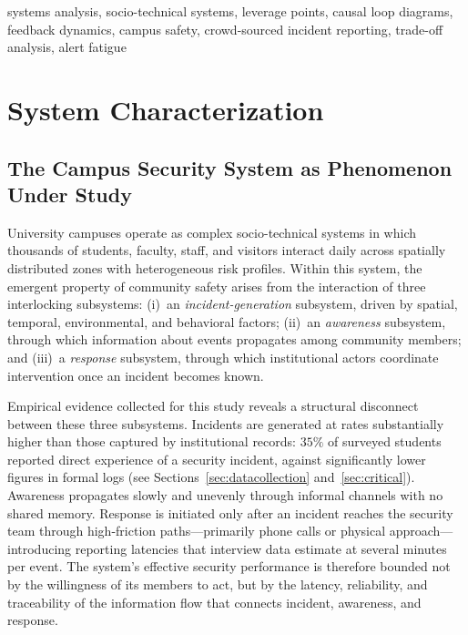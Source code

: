 \documentclass[conference]{IEEEtran}
\begin{document}
\begin{IEEEkeywords}
systems analysis, socio-technical systems, leverage points, causal loop
diagrams, feedback dynamics, campus safety, crowd-sourced incident
reporting, trade-off analysis, alert fatigue
\end{IEEEkeywords}

\section{System Characterization}

\subsection{The Campus Security System as Phenomenon Under Study}
University campuses operate as complex socio-technical systems in which
thousands of students, faculty, staff, and visitors interact daily
across spatially distributed zones with heterogeneous risk profiles.
Within this system, the emergent property of community safety arises
from the interaction of three interlocking subsystems:
(i)~an \emph{incident-generation} subsystem, driven by spatial,
temporal, environmental, and behavioral factors;
(ii)~an \emph{awareness} subsystem, through which information about
events propagates among community members; and
(iii)~a \emph{response} subsystem, through which institutional actors
coordinate intervention once an incident becomes known.

Empirical evidence collected for this study reveals a structural
disconnect between these three subsystems. Incidents are generated at
rates substantially higher than those captured by institutional
records: \(35\%\) of surveyed students reported direct experience of a
security incident, against significantly lower figures in formal logs
(see Sections~\ref{sec:datacollection} and~\ref{sec:critical}).
Awareness propagates slowly and unevenly through informal channels
with no shared memory. Response is initiated only after an incident
reaches the security team through high-friction paths---primarily phone
calls or physical approach---introducing reporting latencies that
interview data estimate at several minutes per event. The system's
effective security performance is therefore bounded not by the
willingness of its members to act, but by the latency, reliability,
and traceability of the information flow that connects incident,
awareness, and response.
\end{document}
